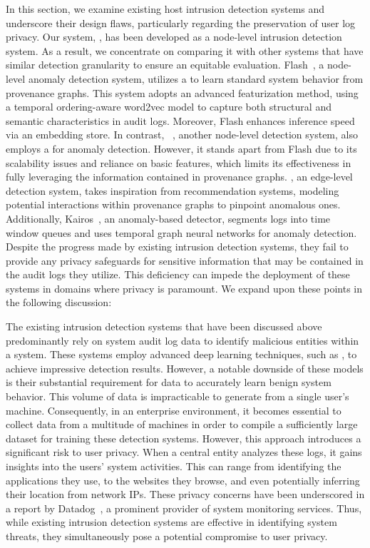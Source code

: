 In this section, we examine existing host intrusion detection systems and underscore their design flaws, particularly regarding the preservation of user log privacy. Our system, \Sys, has been developed as a node-level intrusion detection system. As a result, we concentrate on comparing it with other systems that have similar detection granularity to ensure an equitable evaluation. Flash~\cite{flash2024}, a node-level anomaly detection system, utilizes a \gnn to learn standard system behavior from provenance graphs. This system adopts an advanced featurization method, using a temporal ordering-aware word2vec model to capture both structural and semantic characteristics in audit logs. Moreover, Flash enhances inference speed via an \gnnshort embedding store. In contrast, \threatrace~\cite{wang2022threatrace}, another node-level detection system, also employs a \gnn for anomaly detection. However, it stands apart from Flash due to its scalability issues and reliance on basic features, which limits its effectiveness in fully leveraging the information contained in provenance graphs. \shadewatcher, an edge-level detection system, takes inspiration from recommendation systems, modeling potential interactions within provenance graphs to pinpoint anomalous ones. Additionally, Kairos~\cite{cheng2023kairos}, an anomaly-based detector, segments logs into time window queues and uses temporal graph neural networks for anomaly detection. Despite the progress made by existing intrusion detection systems, they fail to provide any privacy safeguards for sensitive information that may be contained in the audit logs they utilize. This deficiency can impede the deployment of these systems in domains where privacy is paramount. We expand upon these points in the following discussion: 

 The existing intrusion detection systems that have been discussed above predominantly rely on system audit log data to identify malicious entities within a system. These systems employ advanced deep learning techniques, such as \gnn, to achieve impressive detection results. However, a notable downside of these models is their substantial requirement for data to accurately learn benign system behavior. This volume of data is impracticable to generate from a single user's machine. Consequently, in an enterprise environment, it becomes essential to collect data from a multitude of machines in order to compile a sufficiently large dataset for training these detection systems. However, this approach introduces a significant risk to user privacy. When a central entity analyzes these logs, it gains insights into the users' system activities. This can range from identifying the applications they use, to the websites they browse, and even potentially inferring their location from network IPs. These privacy concerns have been underscored in a report by Datadog~\cite{datadog}, a prominent provider of system monitoring services. Thus, while existing intrusion detection systems are effective in identifying system threats, they simultaneously pose a potential compromise to user privacy.


